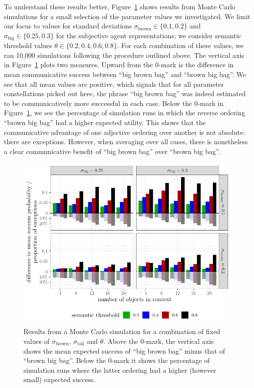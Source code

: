 \documentclass[10pt,a4paper]{article}
\begin{document}
To understand these results better, Figure~\ref{fig:Showcase_examples} shows results from Monte Carlo simulations for a small selection of the parameter values we investigated. We limit our focus to values for standard deviations $\sigma_{\text{brown}} \in \{0.1, 0.2\}$ and $\sigma_{\text{big}} \in \{0.25, 0.3\}$ for the subjective agent representations; we consider semantic threshold values $\theta \in \{ 0.2, 0.4, 0.6, 0.8 \}$. For each combination of these values, we ran 10,000 simulations following the procedure outlined above. The vertical axis in Figure~\ref{fig:Showcase_examples} plots two measures. Upward from the 0-mark is the difference in mean communicative success between ``big brown bag'' and ``brown big bag''. We see that all mean values are positive, which signals that for all parameter constellations picked out here, the phrase ``big brown bag'' was indeed estimated to be communicatively more successful in each case. Below the 0-mark in Figure~\ref{fig:Showcase_examples}, we see the percentage of simulation runs in which the reverse ordering ``brown big bag'' had a higher expected utility. This shows that the communicative advantage of one adjective ordering over another is not absolute: there are exceptions. However, when averaging over all cases, there is nonetheless a clear communicative benefit of ``big brown bag'' over ``brown big bag''.

\begin{figure}
  \centering
  \includegraphics[width = \linewidth]{plots/tikz_combined.pdf}
   \vspace{-25pt}
  \caption{Results from a Monte Carlo simulation for a combination of fixed values of $\sigma_{\text{brown}}$, $\sigma_{\text{tall}}$ and $\theta$. Above the 0-mark, the vertical axis shows the mean expected success of ``big brown bag'' minus that of ``brown big bag''. Below the 0-mark it shows the percentage of simulation runs where the latter ordering had a higher (however small) expected success.}
  \label{fig:Showcase_examples}
\end{figure}
\end{document}
